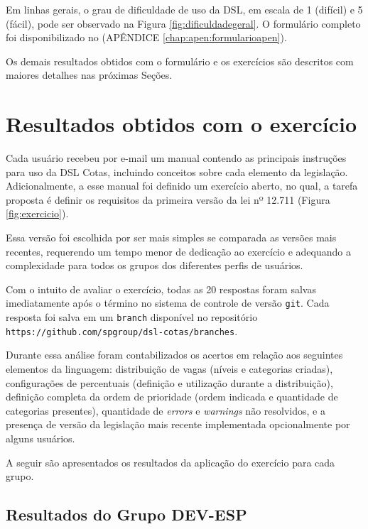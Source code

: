 Em linhas gerais, o grau de dificuldade de uso da DSL, em escala de 1 (difícil) e 5 (fácil), pode ser observado na Figura \ref{fig:dificuldadegeral}. O formulário completo foi disponibilizado no (APÊNDICE \ref{chap:apen:formularioapen}). 



\newpage
Os demais resultados obtidos com o formulário e os exercícios são descritos com maiores detalhes nas próximas Seções.




\section{Resultados obtidos com o exercício}
\label{sec:analiseexercicio}

Cada usuário recebeu por e-mail um manual  contendo as principais instruções para uso da DSL Cotas, incluindo conceitos sobre cada elemento da legislação. Adicionalmente, a esse manual foi definido um exercício aberto, no qual, a tarefa proposta é definir os requisitos da primeira versão da lei nº 12.711 (Figura \ref{fig:exercicio}). 



Essa versão foi escolhida por ser mais simples se comparada as versões mais recentes, requerendo um tempo menor de dedicação ao exercício e adequando a complexidade para todos os grupos dos diferentes perfis de usuários. 


Com o intuito de avaliar o exercício, todas as 20 respostas foram salvas imediatamente após o término no sistema de controle de versão \texttt{git}. Cada resposta foi salva em um \texttt{branch} disponível no repositório \texttt{https://github.com/spgroup/dsl-cotas/branches}.


Durante essa análise foram contabilizados os acertos em relação aos seguintes elementos da linguagem: distribuição de vagas (níveis e categorias criadas), configurações de percentuais (definição e utilização durante a distribuição), definição completa da ordem de prioridade (ordem indicada e quantidade de categorias presentes), quantidade de \textit{errors} e \textit{warnings} não resolvidos, e a presença de versão da legislação mais recente implementada opcionalmente por alguns usuários.

A seguir são apresentados os resultados da aplicação do exercício para cada grupo.


\subsection{Resultados do Grupo DEV-ESP}
\label{subsec:devesp}

